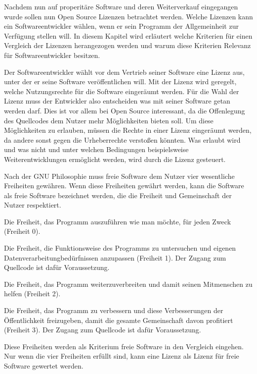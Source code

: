 Nachdem nun auf properitäre Software und deren Weiterverkauf eingegangen wurde sollen nun Open Source Lizenzen betrachtet werden. Welche Lizenzen kann ein Softwareentwickler w\"ahlen, wenn er sein Programm der Allgemeinheit zur Verf\"ugung stellen will.  In diesem Kapitel wird erl\"autert welche Kriterien f\"ur einen Vergleich der Lizenzen herangezogen werden und warum diese Kriterien Relevanz f\"ur Softwareentwickler besitzen.

Der Softwareentwickler w\"ahlt vor dem Vertrieb seiner Software eine Lizenz aus, unter der er seine Software ver\"offentlichen will. Mit der Lizenz wird geregelt, welche Nutzungsrechte f\"ur die Software einger\"aumt werden. F\"ur die Wahl der Lizenz muss der Entwickler also entscheiden was mit seiner Software getan werden darf. Dies ist vor allem bei Open Source interessant, da die Offenlegung des Quellcodes dem Nutzer mehr M\"oglichkeiten bieten soll. Um diese M\"oglichkeiten zu erlauben, m\"ussen die Rechte in einer Lizenz einger\"aumt werden, da andere sonst gegen die Urheberrechte verstoßen k\"onnten. Was erlaubt wird und was nicht und unter welchen Bedingungen beispielsweise Weiterentwicklungen erm\"oglicht werden, wird durch die Lizenz gesteuert. 

Nach der GNU Philosophie muss freie Software dem Nutzer vier wesentliche Freiheiten gew\"ahren. Wenn diese Freiheiten gew\"ahrt werden, kann die Software als freie Software bezeichnet werden, \glqq{}die die Freiheit und Gemeinschaft der Nutzer respektiert.\grqq{} 

\begin{seList} 
\item Die Freiheit, das Programm auszuf\"uhren wie man m\"ochte, f\"ur jeden Zweck (Freiheit 0).
\item Die Freiheit, die Funktionsweise des Programms zu untersuchen und eigenen Datenverarbeitungbed\"urfnissen anzupassen (Freiheit 1). Der Zugang zum Quellcode ist daf\"ur Voraussetzung.
\item Die Freiheit, das Programm weiterzuverbreiten und damit seinen Mitmenschen zu helfen (Freiheit 2).
\item Die Freiheit, das Programm zu verbessern und diese Verbesserungen der \"Offentlichkeit freizugeben, damit die gesamte Gemeinschaft davon profitiert (Freiheit 3). Der Zugang zum Quellcode ist daf\"ur Voraussetzung.
\end{seList}
Diese Freiheiten werden als Kriterium \glqq{}freie Software\grqq{} in den Vergleich eingehen. Nur wenn die vier Freiheiten erf\"ullt sind, kann eine Lizenz als Lizenz f\"ur freie Software gewertet werden. 

